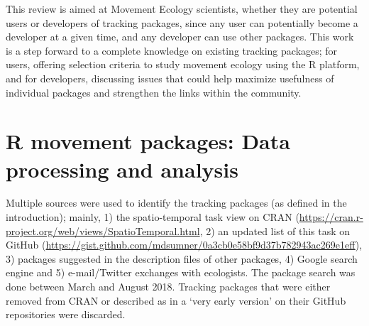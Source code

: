 \documentclass[a4paper,12pt]{article}
\begin{document}
This review is aimed at Movement Ecology scientists, whether they are potential users or developers of tracking packages, since any user can potentially become a developer at a given time, and any developer can use other packages. This work is a step forward to a complete %
knowledge on existing tracking packages; for users, offering selection criteria to study movement ecology using the R platform, and for developers, discussing issues that could help maximize usefulness of individual packages and strengthen the links within the community. 


\section*{R movement packages: Data processing and analysis}

Multiple sources were used to identify the tracking packages (as defined in the introduction); mainly, 1) the spatio-temporal task view on CRAN (\url{https://cran.r-project.org/web/views/SpatioTemporal.html}, 2) an updated list of this task on GitHub (\url{https://gist.github.com/mdsumner/0a3cb0e58bf9d37b782943ac269e1eff}), 3) packages suggested in the description files of other packages, 4) Google search engine and 5) e-mail/Twitter exchanges with ecologists. The package search was done between March and August 2018. Tracking packages that were either removed from CRAN or described as in a `very early version' on their GitHub repositories were discarded. 
\end{document}
